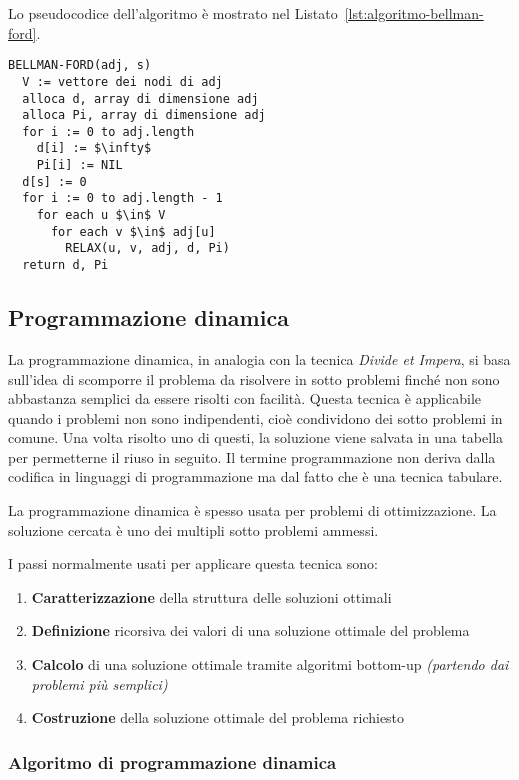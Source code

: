 \documentclass[italian, 10pt]{article}
\begin{document}
\bigskip
Lo pseudocodice dell'algoritmo è mostrato nel Listato~\ref{lst:algoritmo-bellman-ford}.

\begin{lstlisting}[style=pseudocode, caption={Algoritmo di Bellman-Ford}, label={lst:algoritmo-bellman-ford}]
BELLMAN-FORD(adj, s)
  V := vettore dei nodi di adj
  alloca d, array di dimensione adj
  alloca Pi, array di dimensione adj
  for i := 0 to adj.length
    d[i] := $\infty$
    Pi[i] := NIL
  d[s] := 0
  for i := 0 to adj.length - 1
    for each u $\in$ V
      for each v $\in$ adj[u]
        RELAX(u, v, adj, d, Pi)
  return d, Pi
\end{lstlisting}

\subsection{Programmazione dinamica}

La programmazione dinamica, in analogia con la tecnica \textit{Divide et Impera}, si basa sull'idea di scomporre il problema da risolvere in sotto problemi finché non sono abbastanza semplici da essere risolti con facilità.
Questa tecnica è applicabile quando i problemi non sono indipendenti, cioè condividono dei sotto problemi in comune.
Una volta risolto uno di questi, la soluzione viene salvata in una tabella per permetterne il riuso in seguito.
Il termine programmazione non deriva dalla codifica in linguaggi di programmazione ma dal fatto che è una tecnica tabulare.

La programmazione dinamica è spesso usata per problemi di ottimizzazione.
La soluzione cercata è uno dei multipli sotto problemi ammessi.

\bigskip
I passi normalmente usati per applicare questa tecnica sono:

\begin{enumerate}
  \item \textbf{Caratterizzazione} della struttura delle soluzioni ottimali
  \item \textbf{Definizione} ricorsiva dei valori di una soluzione ottimale del problema
  \item \textbf{Calcolo} di una soluzione ottimale tramite algoritmi bottom-up \textit{(partendo dai problemi più semplici)}
  \item \textbf{Costruzione} della soluzione ottimale del problema richiesto
\end{enumerate}

\subsubsection{Algoritmo di programmazione dinamica}
\end{document}
